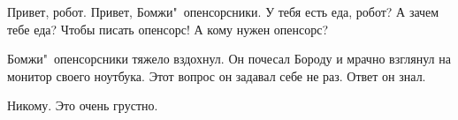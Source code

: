 \begin{dialog}
\X Привет, робот.
\R Привет, Бомжи"~опенсорсники.
\X У тебя есть еда, робот?
\R А зачем тебе еда?
\X Чтобы писать опенсорс!
\R А кому нужен опенсорс?
\end{dialog}

\begin{monolog}
Бомжи"~опенсорсники тяжело вздохнул. Он почесал Бороду и мрачно взглянул на монитор своего ноутбука. Этот вопрос он задавал себе не раз. Ответ он знал.
\end{monolog}

\begin{dialog}
\X Никому.
\R Это очень грустно.
\end{dialog}